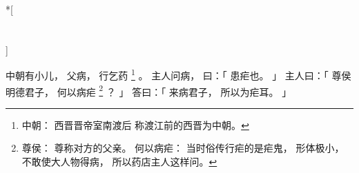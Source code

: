 
\switchcolumn[0]*[\section{}]

中朝有小儿，
父病，
行乞药%
\footnote{%
    中朝：
        西晋晋帝室南渡后
        称渡江前的西晋为中朝。
}%
。
主人问病，
曰：「
    患疟也。
」
主人曰：「
    尊侯明德君子，
    何以病疟%
    \footnote{%
        尊侯：
            尊称对方的父亲。
        何以病疟：
            当时俗传行疟的是疟鬼，
            形体极小，
            不敢使大人物得病，
            所以药店主人这样问。
    }%
    ？
」
答曰：「
    来病君子，
    所以为疟耳。
」

\switchcolumn


